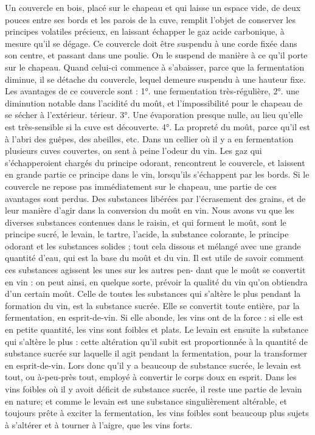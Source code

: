 Un couvercle en bois, placé sur le chapeau et qui laisse un espace vide, de deux pouces entre ses bords et les parois de la cuve, remplit l'objet de conserver les principes volatiles précieux, en laissant échapper le gaz acide carbonique, à mesure qu'il se dégage.
Ce couvercle doit être suspendu à une corde fixée dans son centre, et passant dans une poulie. On le suspend de manière à ce qu'il porte sur le chapeau. Quand celui-ci commence à s'abaisser, parce que la fermentation diminue, il se détache du couvercle, lequel demeure suspendu à une hauteur fixe. Les avantages de ce couvercle sont : 1°. une fermentation très-régulière, 2°. une diminution notable dans l'acidité du moût, et l'impossibilité pour le chapeau de se sécher à l'extérieur.\setcounter{page}{93} térieur. 3°. Une évaporation presque nulle, au lieu qu'elle est très-sensible si la cuve est découverte. 4°. La propreté du moût, parce qu'il est à l'abri des guêpes, des abeilles, etc.
Dans un cellier où il y a en fermentation plusieurs cuves couvertes, on sent à peine l'odeur du vin. Les gaz qui s'échapperoient chargés du principe odorant, rencontrent le couvercle, et laissent en grande partie ce principe dans le vin, lorsqu'ils s'échappent par les bords.
Si le couvercle ne repose pas immédiatement sur le chapeau, une partie de ces avantages sont perdus.
Des substances libérées par l'écrasement des grains, et de leur manière d'agir dans la conversion du moût en vin.
Nous avons vu que les diverses substances contenues dans le raisin, et qui forment le moût, sont le principe sucré, le levain, le tartre, l'acide, la substance colorante, le principe odorant et les substances solides ; tout cela dissous et mélangé avec une grande quantité d'eau, qui est la base du moût et du vin.
Il est utile de savoir comment ces substances agissent les unes sur les autres pen-\setcounter{page}{94} dant que le moût se convertit en vin : on peut ainsi, en quelque sorte, prévoir la qualité du vin qu'on obtiendra d'un certain moût.
Celle de toutes les substances qui s'altère le plus pendant la formation du vin, est la substance sucrée. Elle se convertit toute entière, par la fermentation, en esprit-de-vin. Si elle abonde, les vins ont de la force : si elle est en petite quantité, les vins sont foibles et plats.
Le levain est ensuite la substance qui s'altère le plus : cette altération qu'il subit est proportionnée à la quantité de substance sucrée sur laquelle il agit pendant la fermentation, pour la transformer en esprit-de-vin.
Lors donc qu'il y a beaucoup de substance sucrée, le levain est tout, ou à-peu-près tout, employé à convertir le corps doux en esprit. Dans les vins foibles où il y avoit déficit de substance sucrée, il reste une partie de levain en nature; et comme le levain est une substance singulièrement altérable, et toujours prête à exciter la fermentation, les vins foibles sont beaucoup plus sujets à s'altérer et à tourner à l'aigre, que les vins forts.
